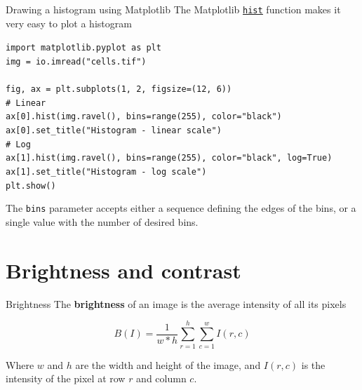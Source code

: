 \documentclass[9pt, aspectratio=169]{beamer}
\begin{document}
\begin{frame}
    {Drawing a histogram using Matplotlib}
    The Matplotlib \href{https://matplotlib.org/stable/api/_as_gen/matplotlib.pyplot.hist.html}{\underline{\texttt{hist}}} function makes it very easy to plot a histogram

    \begin{codebox}
        \texttt{import matplotlib.pyplot as plt\\
            img = io.imread("cells.tif")\\
            \\
            fig, ax = plt.subplots(1, 2, figsize=(12, 6))\\
            \# Linear\\
            ax[0].hist(img.ravel(), bins=range(255), color="black")\\
            ax[0].set\_title("Histogram - linear scale")\\
            \pause
            \# Log\\
            ax[1].hist(img.ravel(), bins=range(255), color="black", log=True)\\
            ax[1].set\_title("Histogram - log scale")\\
            plt.show()}
    \end{codebox}

    The \texttt{bins} parameter accepts either a sequence defining the edges of the bins, or a single value with the number of desired bins.
\end{frame}

\section {Brightness and contrast}

\begin{frame}
    {Brightness}
    The \textbf{brightness} of an image is the average intensity of all its pixels

    $$B(I) = \frac{1}{w*h}\sum_{r=1}^{h}\sum_{c=1}^{w}I(r,c)$$

    Where $w$ and $h$ are the width and height of the image, and $I(r,c)$ is the intensity of the pixel at row $r$ and column $c$.
\end{frame}
\end{document}
